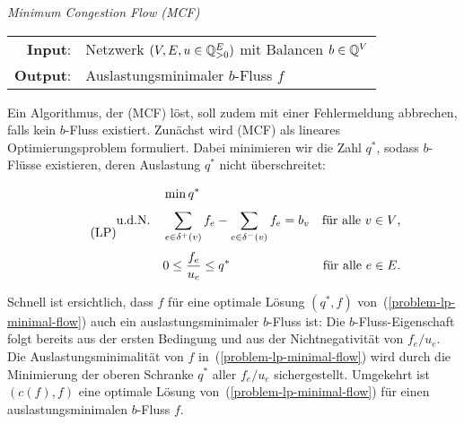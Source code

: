 \begin{center}
	\begin{mdframed}
		\centering
		\emph{Minimum Congestion Flow (MCF)} \\[1em]
		\begin{tabular}{rl}
			{\bfseries Input}: &Netzwerk $(V, E,u \in \mathbb{Q}^E_{>0})$ mit Balancen $b\in\mathbb{Q}^V$\\
			{\bfseries Output}: &Auslastungsminimaler $b$-Fluss $f$
		\end{tabular}
	\end{mdframed}
\end{center}

Ein Algorithmus, der (MCF) löst, soll zudem mit einer Fehlermeldung abbrechen, falls kein $b$-Fluss existiert.
Zunächst wird (MCF) als lineares Optimierungsproblem formuliert.
Dabei minimieren wir die Zahl $q^*$, sodass $b$-Flüsse existieren, deren Auslastung $q^*$ nicht überschreitet:

\begin{equation}\tag{LP}\label{problem-lp-minimal-flow}
\begin{aligned}
& \min q^* \\[0.3em]
\text{u.d.N.\quad} & \sum_{e\in \delta^+(v)} f_e - \sum_{e\in\delta^-(v)} f_e = b_v & \text{für alle $v\in V$,} \\[0.3em]
& 0 \leq \frac{f_e}{u_e} \leq q^* & \text{für alle $e\in E$.}
\end{aligned}
\end{equation}

Schnell ist ersichtlich, dass $f$ für eine optimale Lösung $(q^*, f)$ von~(\ref{problem-lp-minimal-flow}) auch ein auslastungsminimaler $b$-Fluss ist: Die $b$-Fluss-Eigenschaft folgt bereits aus der ersten Bedingung und aus der Nichtnegativität von $f_e / u_e$.
Die Auslastungsminimalität von $f$ in~(\ref{problem-lp-minimal-flow}) wird durch die Minimierung der oberen Schranke $q^*$ aller $f_e / u_e$ sichergestellt.
Umgekehrt ist $(c(f), f)$ eine optimale Lösung von~(\ref{problem-lp-minimal-flow}) für einen auslastungsminimalen $b$-Fluss $f$.


